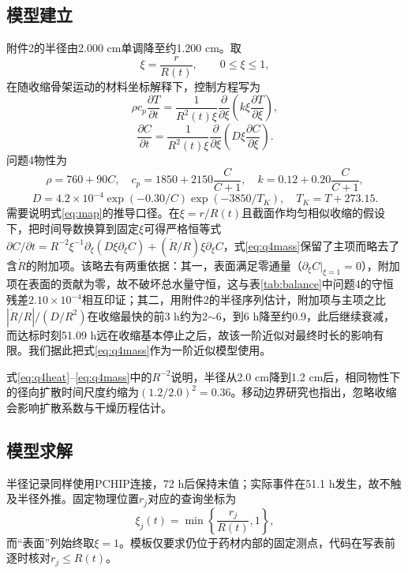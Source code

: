 \documentclass[zihao=-4,UTF8]{ctexart}
\begin{document}
\subsection{模型建立}
附件2的半径由2.000 cm单调降至约1.200 cm。取
\begin{equation}\label{eq:map}
\xi=\frac{r}{R(t)},\qquad 0\le\xi\le1,
\end{equation}
在随收缩骨架运动的材料坐标解释下，控制方程写为
\begin{equation}\label{eq:q4heat}
\rho c_p\frac{\partial T}{\partial t}=\frac{1}{R^2(t)\xi}\frac{\partial}{\partial\xi}\left(k\xi\frac{\partial T}{\partial\xi}\right),
\end{equation}
\begin{equation}\label{eq:q4mass}
\frac{\partial C}{\partial t}=\frac{1}{R^2(t)\xi}\frac{\partial}{\partial\xi}\left(D\xi\frac{\partial C}{\partial\xi}\right).
\end{equation}
问题4物性为
\begin{equation}\label{eq:q4prop1}
\rho=760+90C,\quad c_p=1850+2150\frac{C}{C+1},\quad k=0.12+0.20\frac{C}{C+1},
\end{equation}
\begin{equation}\label{eq:q4prop2}
D=4.2\times10^{-4}\exp(-0.30/C)\exp(-3850/T_K),\quad T_K=T+273.15.
\end{equation}
需要说明式\eqref{eq:map}的推导口径。在$\xi=r/R(t)$且截面作均匀相似收缩的假设下，把时间导数换算到固定$\xi$可得严格恒等式$\partial C/\partial t=R^{-2}\xi^{-1}\partial_\xi(D\xi\partial_\xi C)+(\dot R/R)\xi\partial_\xi C$，式\eqref{eq:q4mass}保留了主项而略去了含$\dot R$的附加项。该略去有两重依据：其一，表面满足零通量（$\partial_\xi C|_{\xi=1}=0$），附加项在表面的贡献为零，故不破坏总水量守恒，这与表\ref{tab:balance}中问题4的守恒残差$2.10\times10^{-4}$相互印证；其二，用附件2的半径序列估计，附加项与主项之比$|\dot R/R|/(D/R^2)$在收缩最快的前3 h约为2$\sim$6，到6 h降至约0.9，此后继续衰减，而达标时刻51.09 h远在收缩基本停止之后，故该一阶近似对最终时长的影响有限。我们据此把式\eqref{eq:q4mass}作为一阶近似模型使用。

式\eqref{eq:q4heat}--\eqref{eq:q4mass}中的$R^{-2}$说明，半径从2.0 cm降到1.2 cm后，相同物性下的径向扩散时间尺度约缩为$(1.2/2.0)^2=0.36$。移动边界研究也指出，忽略收缩会影响扩散系数与干燥历程估计\cite{ref4,ref5,ref9}。

\subsection{模型求解}
半径记录同样使用PCHIP连接，72 h后保持末值；实际事件在51.1 h发生，故不触及半径外推。固定物理位置$r_j$对应的查询坐标为
\begin{equation}\label{eq:query}
\xi_j(t)=\min\left\{\frac{r_j}{R(t)},1\right\},
\end{equation}
而“表面”列始终取$\xi=1$。模板仅要求仍位于药材内部的固定测点，代码在写表前逐时核对$r_j\le R(t)$。
\end{document}
